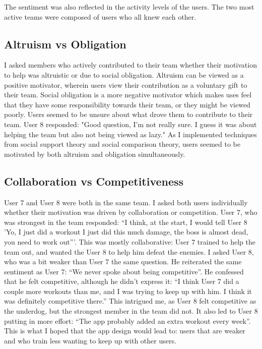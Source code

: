\documentclass{l4proj}
\begin{document}
The sentiment was also reflected in the activity levels of the users. The two most active teams were composed of users who all knew each other.

\subsection{Altruism vs Obligation}
I asked members who actively contributed to their team whether their motivation to help was altruistic or due to social obligation. Altruism can be viewed as a positive motivator, wherein users view their contribution as a voluntary gift to their team. Social obligation is a more negative motivator which makes uses feel that they have some responsibility towards their team, or they might be viewed poorly. Users seemed to be unsure about what drove them to contribute to their team. User 8 responded: "Good question, I'm not really sure. I guess it was about helping the team but also not being viewed as lazy." As I implemented techniques from social support theory and social comparison theory, users seemed to be motivated by both altruism and obligation simultaneously.

\subsection{Collaboration vs Competitiveness}
User 7 and User 8 were both in the same team. I asked both users individually whether their motivation was driven by collaboration or competition. User 7, who was strongest in the team responded: ``I think, at the start, I would tell User 8 'Yo, I just did a workout I just did this much damage, the boss is almost dead, you need to work out'''. This was mostly collaborative: User 7 trained to help the team out, and wanted the User 8 to help him defeat the enemies. I asked User 8, who was a bit weaker than User 7 the same question. He reiterated the same sentiment as User 7: ``We never spoke about being competitive''. He confessed that he felt competitive, although he didn't express it: ``I think User 7 did a couple more workouts than me, and I was trying to keep up with him. I think it was definitely competitive there.'' This intrigued me, as User 8 felt competitive as the underdog, but the strongest member in the team did not. It also led to User 8 putting in more effort: ``The app probably added an extra workout every week''. This is what I hoped that the app design would lead to: users that are weaker and who train less wanting to keep up with other users.
\end{document}
